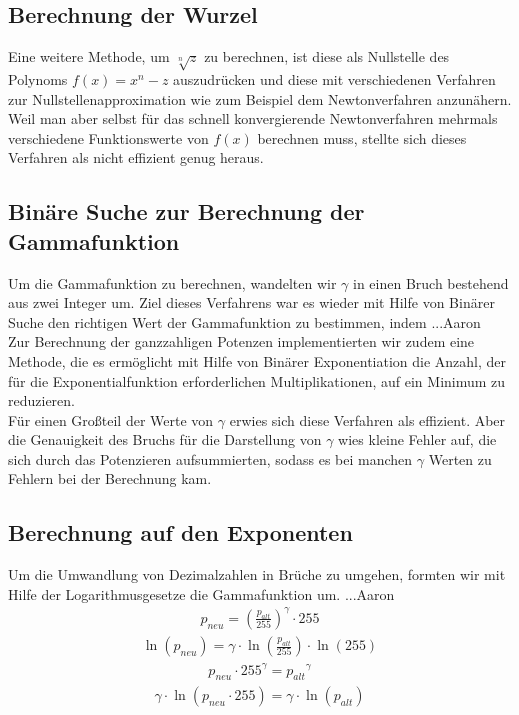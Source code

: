 \documentclass[course=erap]{aspdoc}
\begin{document}
\subsection{Berechnung der Wurzel}
Eine weitere Methode, um $\sqrt[n]{z}$ zu berechnen, ist diese als Nullstelle des Polynoms $f(x)=x^n-z$ auszudrücken und diese mit verschiedenen Verfahren zur Nullstellenapproximation wie zum Beispiel dem Newtonverfahren anzunähern. Weil man aber selbst für das schnell konvergierende Newtonverfahren mehrmals verschiedene Funktionswerte von $f(x)$ berechnen muss, stellte sich dieses Verfahren als nicht effizient genug heraus.     

\subsection{Binäre Suche zur Berechnung der Gammafunktion}
Um die Gammafunktion zu berechnen, wandelten wir  $\gamma$ in einen Bruch bestehend aus zwei Integer um. Ziel dieses Verfahrens war es wieder mit Hilfe von Binärer Suche den richtigen Wert der Gammafunktion zu bestimmen, indem ...Aaron
\\
\newline
\noindent	
Zur Berechnung der ganzzahligen Potenzen implementierten wir zudem eine Methode, die es ermöglicht mit Hilfe von Binärer Exponentiation die Anzahl, der für die Exponentialfunktion erforderlichen Multiplikationen, auf ein Minimum zu reduzieren. 
\\
\newline
\noindent		 
Für einen Großteil der Werte von $\gamma$ erwies sich diese Verfahren als effizient. Aber die Genauigkeit des Bruchs für die Darstellung von $\gamma$ wies kleine Fehler auf, die sich durch das Potenzieren aufsummierten, sodass es bei manchen $\gamma$ Werten zu Fehlern bei der Berechnung kam.       

\subsection{Berechnung auf den Exponenten}
Um die Umwandlung von Dezimalzahlen in Brüche zu umgehen, formten wir mit Hilfe der Logarithmusgesetze die Gammafunktion um. ...Aaron
\begin{align}	
p_{neu} = \left(\frac{p_{alt}}{255}\right)^{\gamma} \cdot 255
\end{align}
\begin{align}	
\ln (p_{neu}) = \gamma \cdot \ln\left(\frac{p_{alt}}{255}\right) \cdot \ln(255)
\end{align}
\begin{align}
p_{neu} \cdot 255^\gamma = {p_{alt}}^{\gamma}
\end{align}
\begin{align}
\gamma \cdot \ln ( p_{neu} \cdot 255) = \gamma \cdot \ln({p_{alt}})
\end{align}
\end{document}
